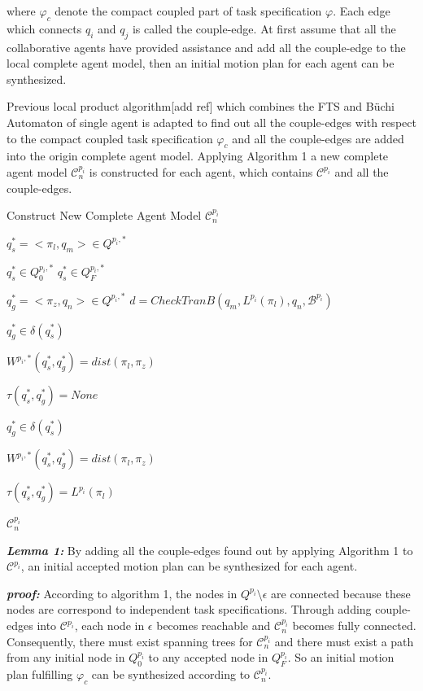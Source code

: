 \documentclass[journal]{IEEEtran}
\begin{document}
where $\varphi_c$ denote the compact coupled part of task specification $\varphi$.
Each edge which connects $q_i$ and $q_j$ is called the couple-edge.
At first assume that all the collaborative agents have provided assistance and add all the couple-edge to the local complete agent model, then an initial motion plan for each agent can be synthesized.\par
Previous local product algorithm[add ref] which combines the FTS and B\"{u}chi Automaton of single agent is adapted to find out all the couple-edges with respect to the compact coupled task specification $\varphi_c$ and all the couple-edges are added into the origin complete agent model. Applying Algorithm 1 a new complete agent model $\mathcal{C}^{p_i}_n$ is constructed for each agent, which contains $\mathcal{C}^{p_i}$ and all the couple-edges.\par
\begin{algorithm}
  \caption{Construct New Complete Agent Model $\mathcal{C}^{p_i}_n$}
  {
    $q^{\ast}_s=<\pi_l,q_m>\in Q^{p_i,\ast}$

    {
        $q^{\ast}_s\in Q^{p_i,\ast}_0$
    }
    {
        $q^{\ast}_s\in Q^{p_i,\ast}_F$
    }
    {
        $q^{\ast}_g=<\pi_z,q_n>\in Q^{p_i,\ast}$
        $d = CheckTranB(q_m,L^{p_i}(\pi_l),q_n,\mathcal{B}^{p_i})$

        {
            $q^{\ast}_g\in \delta(q^{\ast}_s)$

            $W^{p_i,\ast}(q^{\ast}_s,q^{\ast}_g)=dist(\pi_l,\pi_z)$

            $\tau(q^{\ast}_s,q^{\ast}_g) = None$
        }
        \Else
        {
            {
                $q^{\ast}_g\in \delta(q^{\ast}_s)$

                $W^{p_i,\ast}(q^{\ast}_s,q^{\ast}_g)=dist(\pi_l,\pi_z)$

                $\tau(q^{\ast}_s,q^{\ast}_g)=L^{p_i}(\pi_l)$
            }
        }
    }
  }
  \Return $\mathcal{C}^{p_i}_n$
\end{algorithm}

\textbf{\emph{Lemma 1:}} By adding all the couple-edges found out by applying Algorithm 1 to $\mathcal{C}^{p_i}$, an initial accepted motion plan can be synthesized for each agent.\par
\textbf{\emph{proof:}} According to algorithm 1, the nodes in $Q^{p_i} \setminus \epsilon$ are connected because these nodes are correspond to independent task specifications. Through adding couple-edges into $\mathcal{C}^{p_i}$, each node in $\epsilon$ becomes reachable and $\mathcal{C}^{p_i}_n$ becomes fully connected. Consequently, there must exist spanning trees for $\mathcal{C}^{p_i}_n$ and there must exist a path from any initial node in $Q_0^{p_i}$ to any accepted node in $Q_F^{p_i}$. So an initial motion plan fulfilling $\varphi_c$ can be synthesized according to $\mathcal{C}^{p_i}_n$.
\end{document}
